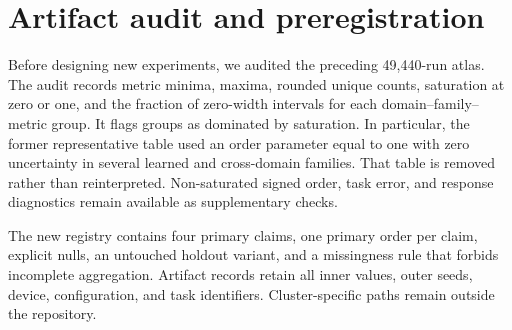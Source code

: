 \section{Artifact audit and preregistration}

Before designing new experiments, we audited the preceding 49,440-run atlas.
The audit records metric minima, maxima, rounded unique counts, saturation at
zero or one, and the fraction of zero-width intervals for each
domain--family--metric group.  \ifnum{} It flags
\SaturatedLegacyGroups{} groups as dominated by saturation. \fi In particular,
the former representative table used an order parameter equal to one with
zero uncertainty in several learned and cross-domain families.  That table is
removed rather than reinterpreted.  Non-saturated signed order, task error,
and response diagnostics remain available as supplementary checks.

The new registry contains four primary claims, one primary order per claim,
explicit nulls, an untouched holdout variant, and a missingness rule that
forbids incomplete aggregation.  Artifact records retain all inner values,
outer seeds, device, configuration, and task identifiers.  Cluster-specific
paths remain outside the repository.

